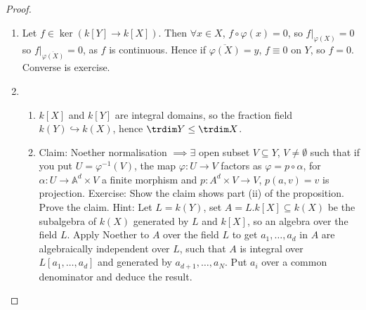 \documentclass{article}
\newcommand{\A}{\mathbb{A}}
\begin{document}
\begin{proof}
    \begin{enumerate}[label=(\alph*)]
        \item Let $f \in \ker(k[Y] \to k[X])$. Then $\forall x \in X$, $f \circ \varphi (x) = 0$, so $f|_{\varphi(X)} = 0$ so $f|_{\overline{\varphi(X)}} = 0$, as $f$ is continuous.
            Hence if $\overline{\varphi(X)} = y$, $f \equiv 0$ on $Y$, so $f = 0$. Converse is exercise.
        \item
            \begin{enumerate}[label=(\roman*)]
            \item $k[X]$ and $k[Y]$ are integral domains, so the fraction field $k(Y) \hookrightarrow k(X)$, hence $\trdim Y \leq \trdim X$.
            \item Claim: Noether normalisation $\implies \exists$ open subset $V \subseteq Y$, $V \neq \emptyset $ such that if you put $U = \varphi^{-1}(V)$, the map $\varphi: U \to V$ factors as $\varphi = p \circ \alpha$, for $\alpha: U \to \A^d \times V$ a finite morphism and $p: A^d \times V \to V$, $p(a, v) = v$ is projection.
                Exercise: Show the claim shows part (ii) of the proposition. Prove the claim. Hint: Let $L = k(Y)$, set $A = L. k[X] \subseteq k(X)$ be the subalgebra of $k(X)$ generated by $L$ and $k[X]$, so an algebra over the field $L$.
                Apply Noether to $A$ over the field $L$ to get $a_1, \dotsc, a_d$ in $A$ are algebraically independent over $L$, such that $A$ is integral over $L[a_1, \dotsc, a_d]$ and generated by $a_{d+1}, \dots, a_N$.
                Put $a_i$ over a common denominator and deduce the result.
            \end{enumerate}
    \end{enumerate}
\end{proof}
\end{document}
